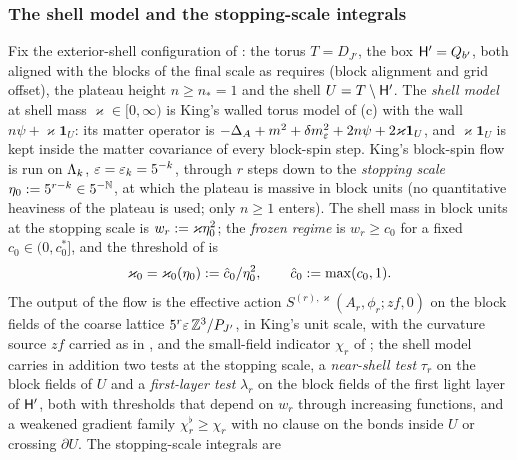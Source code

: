\providecommand{\Ish}{\ensuremath{I^{\sharp}}}
\providecommand{\Ifull}{\ensuremath{I}}
\providecommand{\Scap}{\ensuremath{\tilde S^{\mathrm{cap}}}}
\providecommand{\chicap}{\ensuremath{\tilde\chi^{\mathrm{cap}}}}
\providecommand{\kz}{\ensuremath{\varkappa_0}}

\subsubsection*{The shell model and the stopping-scale integrals}

Fix the exterior-shell configuration of : the torus $T=D_{J'}$, the box $\mathsf H'=Q_{b'}$, both aligned with the blocks of the final scale as  requires (block alignment and grid offset), the plateau height $n\ge n_*=1$ and the shell $U=T\setminus\mathsf H'$. The \emph{shell model} at shell mass $\varkappa\in[0,\infty)$ is King's walled torus model of (c) with the wall $n\psi+\varkappa\mathbf 1_U$: its matter operator is $-\Delta_A+m^2+\delta m^2_{\varepsilon}+2n\psi+2\varkappa\mathbf 1_U$, and $\varkappa\mathbf 1_U$ is kept inside the matter covariance of every block-spin step. King's block-spin flow \cite[\S3]{K1} is run on $\Lambda_k$, $\varepsilon=\varepsilon_k=5^{-k}$, through $r$ steps down to the \emph{stopping scale} $\eta_0:=5^{r-k}\in5^{-\mathbb N}$, at which the plateau is massive in block units (no quantitative heaviness of the plateau is used; only $n\ge1$ enters). The shell mass in block units at the stopping scale is $w_r:=\varkappa\eta_0^2$; the \emph{frozen regime} is $w_r\ge c_0$ for a fixed $c_0\in(0,c_0^*]$, and the threshold of  is
\[
\kz=\varkappa_0(\eta_0)\defeq\hat c_0/\eta_0^2,\qquad\hat c_0\defeq\max(c_0,1).
\]
The output of the flow is the effective action $S^{(r),\varkappa}(A_r,\phi_r;zf,0)$ on the block fields of the coarse lattice $5^r\varepsilon\,\mathbb Z^3/P_{J'}$, in King's unit scale, with the curvature source $zf$ carried as in \cite[(3.20)]{K1}, and the small-field indicator $\chi_r$ of \cite[(3.2)]{K1}; the shell model carries in addition two tests at the stopping scale, a \emph{near-shell test} $\tau_r$ on the block fields of $U$ and a \emph{first-layer test} $\lambda_r$ on the block fields of the first light layer of $\mathsf H'$, both with thresholds that depend on $w_r$ through increasing functions, and a weakened gradient family $\chi_r^\flat\ge\chi_r$ with no clause on the bonds inside $U$ or crossing $\partial U$. The stopping-scale integrals are
